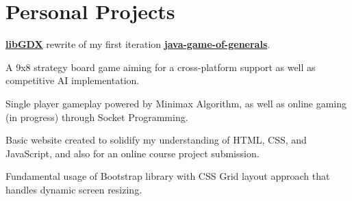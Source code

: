 \documentclass[]{deedy-resume-openfont}
\begin{document}
%
%
\lastupdated

%
%

%
%

\begin{minipage}[t]{0.60\textwidth}


\section{Personal Projects}

\vspace{\topsep} %
\begin{tightemize}
\item \textbf{\href{https://libgdx.badlogicgames.com/}{libGDX}} rewrite of my first iteration \textbf{\href{https://github.com/marklcrns/java-game-of-generals}{java-game-of-generals}}.
\item A 9x8 strategy board game aiming for a cross-platform support as well as competitive AI implementation.
\item Single player gameplay powered by Minimax Algorithm, as well as online gaming (in progress) through Socket Programming.
\end{tightemize}

\vspace{\topsep} %
\begin{tightemize}
\item Basic website created to solidify my understanding of HTML, CSS, and JavaScript, and also for an online course project submission.
\item Fundamental usage of Bootstrap library with CSS Grid layout approach that handles dynamic screen resizing.
\end{tightemize}


\end{minipage}
\end{document}
